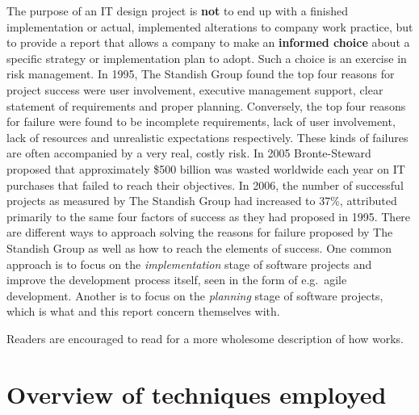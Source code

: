 The purpose of an IT design project is \textbf{not} to end up with a
finished implementation or actual, implemented alterations to company work
practice, but to provide a report that allows a company to make an
\textbf{informed choice} about a specific strategy or implementation plan to
adopt. Such a choice is an exercise in risk management. In 1995, The Standish
Group found the top four reasons for project success were user involvement,
executive management support, clear statement of requirements and proper
planning\cite{standish1995chaos}. Conversely, the top four reasons for failure
were found to be incomplete requirements, lack of user involvement, lack of
resources and unrealistic expectations respectively\cite{standish1995chaos}.
These kinds of failures are often accompanied by a very real, costly risk. In
2005 Bronte-Steward proposed that approximately \$500 billion was wasted
worldwide each year on IT purchases that failed to reach their
objectives\cite{bronte2005developing}. In 2006, the number of successful
projects as measured by The Standish Group\cite{standish2012} had increased to
37\%, attributed primarily to the same four factors of success as they had
proposed in 1995. There are different ways to approach solving the reasons for
failure proposed by The Standish Group as well as how to reach the elements of
success. One common approach is to focus on the \textit{implementation} stage of
software projects and improve the development process itself, seen in the form
of e.g.\ agile development. Another is to focus on the \textit{planning} stage
of software projects, which is what \must{} and this report concern themselves with.

Readers are encouraged to read \cite{bodker2004participatory} for a more
wholesome description of how \must{} works.

\section{Overview of techniques employed} \label{sec:overview}

